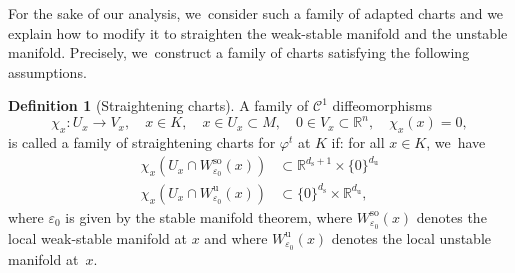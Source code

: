 \documentclass[11pt]{article}
\newcommand{\rs}{\mathrm{s}}
\newcommand{\rso}{\mathrm{so}}
\newcommand{\ru}{\mathrm{u}}
\theoremstyle{definition}
\newtheorem{definition}{Definition}[section]
\theoremstyle{plain}
\newcommand{\Ccal}{\mathcal{C}}
\newcommand{\R}{\mathbb{R}}
\begin{document}
\begin{appendix}
For the sake of our analysis, we~consider such a family of adapted charts and we explain how to modify it to straighten the weak-stable manifold and the unstable manifold. Precisely, we~construct a family of charts satisfying the following assumptions.

\begin{definition}[Straightening charts]\label{def: straightening charts}
A family of $\Ccal^{1}$ diffeomorphisms
\[
\chi_x: U_x \to V_x, \quad x \in K,\quad x \in U_x \subset M, \quad 0 \in V_x \subset \R^n, \quad \chi_x (x) = 0,
\]
is called a family of straightening charts for $\varphi^t$ at $K$ if: for all $x \in K$, we~have
\begin{align*}
\chi_x (U_x \cap W_{\varepsilon_0}^{\rso} (x)) &\subset \R^{d_\rs + 1} \times \{0\}^{d_\ru} \\
\chi_x (U_x \cap W_{\varepsilon_0}^{\ru} (x)) &\subset \{0\}^{d_\rs} \times \R^{d_\ru},
\end{align*}
where $\varepsilon_0$ is given by the stable manifold theorem, where $W_{\varepsilon_0}^{\rso} (x)$ denotes the local weak-stable manifold at $x$ and where $W_{\varepsilon_0}^{\ru} (x)$ denotes the local unstable manifold at~$x$.
\end{definition}


\end{appendix}
\end{document}

